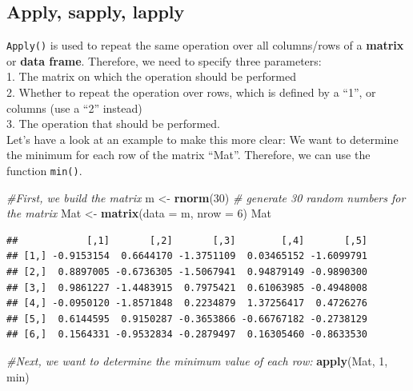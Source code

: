 \documentclass[
]{book}
\newenvironment{Shaded}{\begin{snugshade}}{\end{snugshade}}
\newcommand{\AttributeTok}[1]{\textcolor[rgb]{0.13,0.29,0.53}{#1}}
\newcommand{\CommentTok}[1]{\textcolor[rgb]{0.56,0.35,0.01}{\textit{#1}}}
\newcommand{\DecValTok}[1]{\textcolor[rgb]{0.00,0.00,0.81}{#1}}
\newcommand{\FunctionTok}[1]{\textcolor[rgb]{0.13,0.29,0.53}{\textbf{#1}}}
\newcommand{\NormalTok}[1]{#1}
\newcommand{\OtherTok}[1]{\textcolor[rgb]{0.56,0.35,0.01}{#1}}
\begin{document}
\hypertarget{apply-sapply-lapply}{%
\subsection*{Apply, sapply, lapply}\label{apply-sapply-lapply}}

\texttt{Apply()} is used to repeat the same operation over all columns/rows of a \textbf{matrix} or \textbf{data frame}.
Therefore, we need to specify three parameters:\\
1.
The matrix on which the operation should be performed\\
2.
Whether to repeat the operation over rows, which is defined by a ``1'', or columns (use a ``2'' instead)\\
3.
The operation that should be performed.\\

Let's have a look at an example to make this more clear: We want to determine the minimum for each row of the matrix ``Mat''.
Therefore, we can use the function \texttt{min()}.

\begin{Shaded}
\begin{Highlighting}[]
\CommentTok{\#First, we build the matrix }
\NormalTok{m }\OtherTok{\textless{}{-}} \FunctionTok{rnorm}\NormalTok{(}\DecValTok{30}\NormalTok{)   }\CommentTok{\# generate 30 random numbers for the matrix}
\NormalTok{Mat }\OtherTok{\textless{}{-}} \FunctionTok{matrix}\NormalTok{(}\AttributeTok{data =}\NormalTok{ m, }\AttributeTok{nrow =} \DecValTok{6}\NormalTok{)}
\NormalTok{Mat}
\end{Highlighting}
\end{Shaded}

\begin{verbatim}
##            [,1]       [,2]       [,3]        [,4]       [,5]
## [1,] -0.9153154  0.6644170 -1.3751109  0.03465152 -1.6099791
## [2,]  0.8897005 -0.6736305 -1.5067941  0.94879149 -0.9890300
## [3,]  0.9861227 -1.4483915  0.7975421  0.61063985 -0.4948008
## [4,] -0.0950120 -1.8571848  0.2234879  1.37256417  0.4726276
## [5,]  0.6144595  0.9150287 -0.3653866 -0.66767182 -0.2738129
## [6,]  0.1564331 -0.9532834 -0.2879497  0.16305460 -0.8633530
\end{verbatim}

\begin{Shaded}
\begin{Highlighting}[]
\CommentTok{\#Next, we want to determine the minimum value of each row: }
\FunctionTok{apply}\NormalTok{(Mat, }\DecValTok{1}\NormalTok{, min)}
\end{Highlighting}
\end{Shaded}
\end{document}
